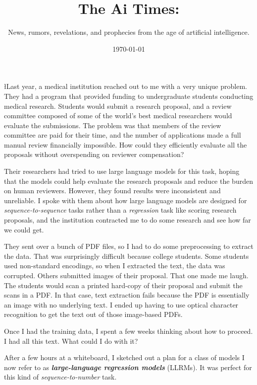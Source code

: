 \documentclass{news}
\title    {The Ai Times:}
\subtitle {News, rumors, revelations, and prophecies from the age of artificial intelligence.}
\date     {\today}
\begin{document}


{\l{L}ast year, a medical institution reached out to me with a very unique problem. They had a program that provided funding to undergraduate students conducting medical research. Students would submit a research proposal, and a review committee composed of some of the world's best medical researchers would evaluate the submissions. The problem was that members of the review committee are paid for their time, and the number of applications made a full manual review financially impossible. How could they efficiently evaluate all the proposals without overspending on reviewer compensation?
\par}

Their researchers had tried to use large language models for this task, hoping that the models could help evaluate the research proposals and reduce the burden on human reviewers. However, they found results were inconsistent and unreliable. I spoke with them about how large language models are designed for \emph{sequence-to-sequence} tasks rather than a \emph{regression} task like scoring research proposals, and the institution contracted me to do some research and see how far we could get.

They sent over a bunch of PDF files, so I had to do some preprocessing to extract the data. That was surprisingly difficult because college students. Some students used non-standard encodings, so when I extracted the text, the data was corrupted. Others submitted images of their proposal. That one made me laugh. The students would scan a printed hard-copy of their proposal and submit the scans in a PDF. In that case, text extraction fails because the PDF is essentially an image with no underlying text. I ended up having to use optical character recognition to get the text out of those image-based PDFs.

Once I had the training data, I spent a few weeks thinking about how to proceed. I had all this text. What could I do with it?

After a few hours at a whiteboard, I sketched out a plan for a class of models I now refer to as \emph{\textbf{large-language regression models}} (LLRMs). It was perfect for this kind of \emph{sequence-to-number} task.

\end{document}
